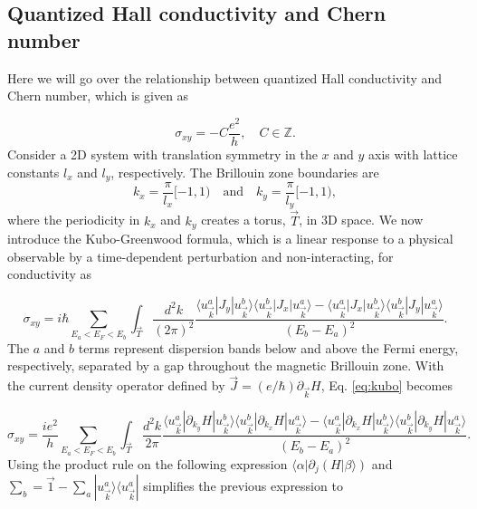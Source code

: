 \subsection{Quantized Hall conductivity and Chern number}

Here we will go over the relationship between quantized Hall conductivity and Chern number, which is given as

\begin{equation}
  \sigma_{xy} = - C\dfrac{e^2}{h}, \quad C \in \mathbb{Z}.
\end{equation}
Consider a 2D system with translation symmetry in the $x$ and $y$ axis with lattice constants $l_x$ and $l_y$, respectively.
The Brillouin zone boundaries are
\begin{equation}
  k_x = \dfrac{\pi}{l_x} [-1,1) \quad \text{and} \quad k_y = \dfrac{\pi}{l_y} [-1,1),
\end{equation}
where the periodicity in $k_x$ and $k_y$ creates a torus, $\vec{T}$, in 3D space.
We now introduce the Kubo-Greenwood formula, which is a linear response to a physical observable by a time-dependent perturbation and non-interacting, for conductivity as

\begin{equation} \label{eq:kubo}
  \sigma_{xy} = i\hbar \sum_{E_a < E_F < E_b} \int_{\vec{T}} \dfrac{d^2k}{(2\pi)^2} \dfrac{\langle u_{\vec{k}}^a | J_y | u_{\vec{k}}^b \rangle \langle u_{\vec{k}}^b | J_x | u_{\vec{k}}^a \rangle - \langle u_{\vec{k}}^a | J_x | u_{\vec{k}}^b \rangle \langle u_{\vec{k}}^b | J_y | u_{\vec{k}}^a \rangle}{{(E_b - E_a)}^2}.
\end{equation}
The $a$ and $b$ terms represent dispersion bands below and above the Fermi energy, respectively, separated by a gap throughout the magnetic Brillouin zone. 
With the current density operator defined by $\vec{J} = (e/\hbar) \partial_{\vec{k}} H$, Eq. \eqref{eq:kubo} becomes

\begin{equation}
  \sigma_{xy} = \dfrac{ie^2}{h} \sum_{E_a < E_F < E_b} \int_{\vec{T}} \dfrac{d^2k}{2\pi} \dfrac{\langle u_{\vec{k}}^a | \partial_{k_y} H | u_{\vec{k}}^b \rangle \langle u_{\vec{k}}^b | \partial_{k_x} H | u_{\vec{k}}^a \rangle - \langle u_{\vec{k}}^a | \partial_{k_x} H | u_{\vec{k}}^b \rangle \langle u_{\vec{k}}^b | \partial_{k_y} H | u_{\vec{k}}^a \rangle}{{(E_b - E_a)}^2}.
\end{equation}
Using the product rule on the following expression $\langle \alpha | \partial_j (H | \beta\rangle)$ and $\sum_b = \vec{1} - \sum_a |u_{\vec{k}}^a\rangle \langle u_{\vec{k}}^a |$ simplifies the previous expression to

